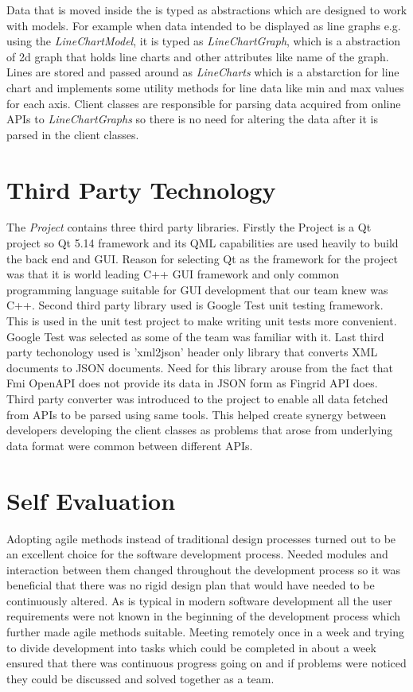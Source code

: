 \documentclass{article}
\begin{document}
Data that is moved inside the is typed as abstractions which are designed to work with models. For example when data intended to be displayed as line graphs e.g. using the \emph{LineChartModel}, it is typed as \emph{LineChartGraph}, which is a abstraction of 2d  graph that holds line charts and other attributes like name of the graph. Lines are stored and passed around as \emph{LineCharts} which is a abstarction for line chart and implements some utility methods for line data like min and max values for each axis.  Client classes are responsible for parsing data acquired from online APIs to \emph{LineChartGraphs} so there is no need for altering the data after it is parsed in the client classes.


\newpage



\section{Third Party Technology}	%

The \emph{Project} contains three third party libraries. Firstly the Project is a Qt project so Qt 5.14 framework and its QML capabilities are used heavily to build the back end and GUI. Reason for selecting Qt as the framework for the project was that it is world leading C++ GUI framework and only common programming language suitable for GUI development that our team knew was C++.  Second third party library used is Google Test unit testing framework. This is used in the unit test project to make writing unit tests more convenient. Google Test was selected as some of the team was familiar with it.  Last third party techonology used is 'xml2json' header only library that converts XML documents to JSON documents. Need for this library arouse from the fact that Fmi OpenAPI does not provide its data in JSON form as Fingrid API does. Third party converter was introduced to the project to enable all data fetched from APIs to be parsed using same tools. This helped create synergy between developers developing the client classes as problems that arose from underlying data format were common between different APIs.


\section{Self Evaluation}	%

Adopting agile methods instead of traditional design processes turned out to be an excellent choice for the software development process. Needed modules and interaction between them changed throughout the development process so it was beneficial that there was no rigid design plan that would have needed to be continuously altered. As is typical in modern software development all the user requirements were not known in the beginning of the development process which further made agile methods suitable. Meeting remotely once in a week and trying to divide development into tasks which could be completed in about a week ensured that there was continuous progress going on and if problems were noticed they could be discussed and solved together as a team.
\end{document}
